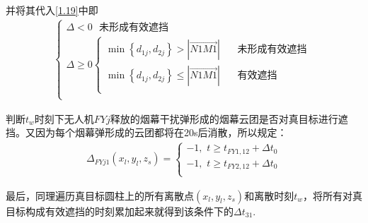 \documentclass[../main.tex]{subfiles}
\begin{document}
\begin{itemize}
并将其代入\eqref{1.19}中即
\begin{align}\label{1.98}
	\left\{ \begin{array}{l}
	\varDelta <0\ \ \ \text{未形成有效遮挡}\\
	\varDelta \ge 0\left\{ \begin{array}{l}
	\min \left\{ d_{1j},d_{2j} \right\} >\left| \overrightarrow{N1M1} \right|\ \ \ \ \ \ \ \ \text{未形成有效遮挡}\\
	\min \left\{ d_{1j},d_{2j} \right\} \le \left| \overrightarrow{N1M1} \right|\ \ \ \ \ \ \ \ \text{有效遮挡}\\
\end{array} \right.\\
\end{array} \right. 
\end{align}
\par 判断$t_w$时刻下无人机$FYj$释放的烟幕干扰弹形成的烟幕云团是否对真目标进行遮挡。又因为每个烟幕弹形成的云团都将在20s后消散，所以规定： 
\begin{align}\label{14.9}
	\Delta _{FYj1}\left( x_l,y_l,z_s \right) =\left\{ \begin{array}{l}
	-1,\,\, t\ge t_{FY1,12}+\Delta t_0\\
	-1,\,\, t\ge t_{FY2,12}+\Delta t_0\\
\end{array} \right.
\end{align}
\end{itemize}
最后，同理遍历真目标圆柱上的所有离散点$(x_l,y_l,z_s)$和离散时刻$t_w$，将所有对真目标构成有效遮挡的时刻累加起来就得到该条件下的$\Delta t_{31}$.
\end{document}
